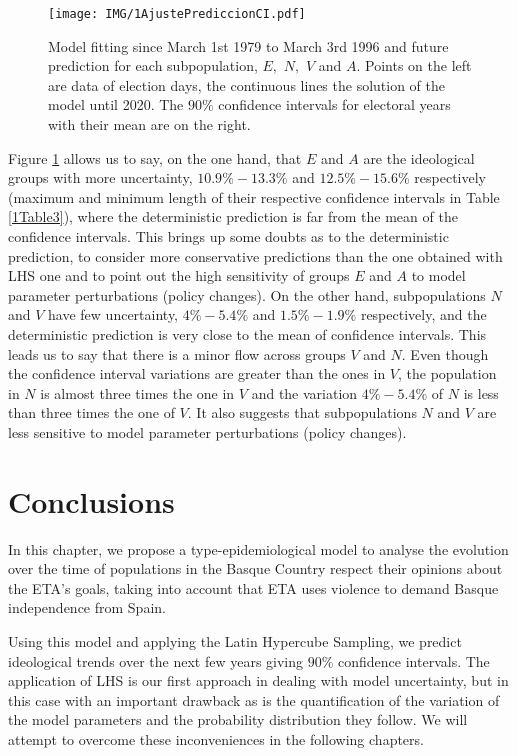 \begin{figure}[htb]
\texttt{[image: IMG/1AjustePrediccionCI.pdf]}
\caption{Model fitting since March 1st 1979 to March 3rd 1996 and future prediction for each subpopulation, $E,$ $N,$ $V$ and $A.$ Points on the left are data of election days, the continuous lines the solution of the model until 2020. The $90\%$ confidence intervals for electoral years with their mean are on the right.}
\label{1ajuste}
\end{figure}

Figure \ref{1ajuste} allows us to say, on the one hand, that $E$ and $A$ are the ideological groups with more uncertainty, $10.9\%-13.3\%$ and  $12.5\%-15.6\%$ respectively (maximum and minimum length of their respective confidence intervals in Table \ref{1Table3}), where the deterministic prediction is far from the mean of the confidence intervals. This brings up some doubts as to the deterministic prediction, to consider more conservative predictions than the one obtained with LHS one and to point out the high sensitivity of groups $E$ and $A$ to model parameter perturbations (policy changes). On the other hand, subpopulations $N$ and $V$ have few uncertainty, $4\%-5.4\%$ and $1.5\%-1.9\%$ respectively, and the deterministic prediction is very close to the mean of confidence intervals. This leads us to say that there is a minor flow across groups $V$ and $N$. Even though the confidence interval variations are greater than the ones in $V$, the population in $N$ is almost three times the one in $V$ and the variation $4\%-5.4\%$ of $N$ is less than three times the one of $V$. It also suggests that subpopulations $N$ and $V$ are less sensitive to model parameter perturbations (policy changes).

\section{Conclusions}\label{1.6}

In this chapter, we propose a type-epidemiological model to analyse the evolution over the time of populations in the Basque Country respect their opinions about the ETA's goals, taking into account that ETA uses violence to demand Basque independence from Spain. 

Using this model and applying the Latin Hypercube Sampling, we predict ideological trends over the next few years giving $90\%$ confidence intervals. The application of LHS is our first approach in dealing with model uncertainty, but in this case with an important drawback as is the quantification of the variation of the model parameters and the probability distribution they follow. We will attempt to overcome these inconveniences in the following chapters.

